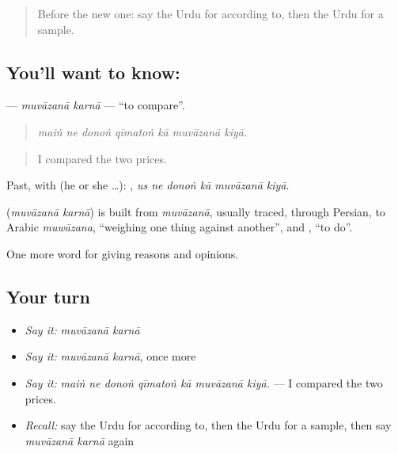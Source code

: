 \label{lesson:UR-C351-muvazana-karna}



\begin{quote}
Before the new one: say the Urdu for according to, then the Urdu for a sample.
\end{quote}

\subsection*{You'll want to know:  }
\textbf{ } — \emph{muvāzanā karnā} — \textquotedblleft{}to compare\textquotedblright{}.

\begin{quote}
      
\end{quote}

\begin{quote}
\emph{maiṅ ne donoṅ qīmatoṅ kā muvāzanā kiyā.}
\end{quote}

\begin{quote}
I compared the two prices.
\end{quote}

Past, with  (he or she …):      , \emph{us ne donoṅ kā muvāzanā kiyā}.

\begin{cousinweb}
\textbf{ } (\emph{muvāzanā karnā}) is built from \emph{muvāzanā}, usually traced, through Persian, to Arabic \emph{muwāzana}, \textquotedblleft{}weighing one thing against another\textquotedblright{}, and \textbf{}, \textquotedblleft{}to do\textquotedblright{}.
\end{cousinweb}

\begin{grammarlens}[title={What you've built}]
One more word for giving reasons and opinions.
\end{grammarlens}

\subsection*{Your turn}
\begin{itemize}
\raggedright
  \item \emph{Say it:} \emph{muvāzanā karnā}
  \item \emph{Say it:} \emph{muvāzanā karnā}, once more
  \item \emph{Say it:} \emph{maiṅ ne donoṅ qīmatoṅ kā muvāzanā kiyā.} — I compared the two prices.
  \item \emph{Recall:} say the Urdu for according to, then the Urdu for a sample, then say \emph{muvāzanā karnā} again
\end{itemize}


